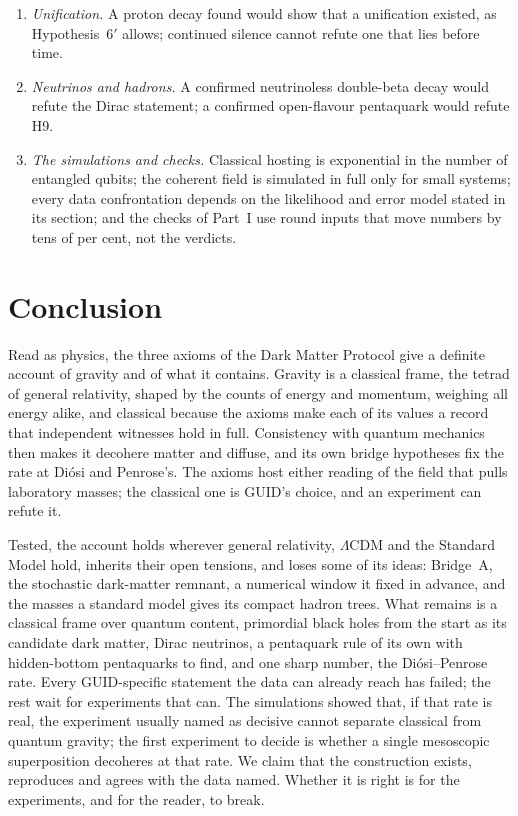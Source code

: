 \begin{enumerate}[nosep]
counts. Read as lying outside DMP's structures, it would leave DMP silent on whether gravity is quantum.
\item \emph{Unification.} A proton decay found would show that a unification existed, as Hypothesis~6$'$ allows; continued silence cannot
refute one that lies before time.
\item \emph{Neutrinos and hadrons.} A confirmed neutrinoless double-beta decay would refute the Dirac statement; a confirmed open-flavour
pentaquark would refute H9.
\item \emph{The simulations and checks.} Classical hosting is exponential in the number of entangled qubits; the coherent field is simulated
in full only for small systems; every data confrontation depends on the likelihood and error model stated in its section; and the checks
of Part~I use round inputs that move numbers by tens of per cent, not the verdicts.
\end{enumerate}

\section{Conclusion}\label{sec:conclusion}

Read as physics, the three axioms of the Dark Matter Protocol give a definite account of gravity and of what it contains. Gravity is a
classical frame, the tetrad of general relativity, shaped by the counts of energy and momentum, weighing all energy alike, and classical
because the axioms make each of its values a record that independent witnesses hold in full. Consistency with quantum mechanics then makes
it decohere matter and diffuse, and its own bridge hypotheses fix the rate at Di\'osi and Penrose's. The axioms host either reading of the
field that pulls laboratory masses; the classical one is GUID's choice, and an experiment can refute it.

Tested, the account holds wherever general relativity, $\Lambda$CDM and the Standard Model hold, inherits their open tensions, and loses
some of its ideas: Bridge~A, the stochastic dark-matter remnant, a numerical window it fixed in advance, and the masses a standard model
gives its compact hadron trees. What remains is a classical frame over quantum content, primordial black holes from the start as its
candidate dark matter, Dirac neutrinos, a pentaquark rule of its own with hidden-bottom pentaquarks to find, and one sharp number, the
Di\'osi--Penrose rate. Every GUID-specific statement the data can already reach has failed; the rest wait for experiments that can. The simulations
showed that, if that rate is real, the experiment usually named as decisive cannot separate classical from quantum gravity; the first
experiment to decide is whether a single mesoscopic superposition decoheres at that rate. We claim that the construction exists,
reproduces and agrees with the data named. Whether it is right is for the experiments, and for the reader, to break.

